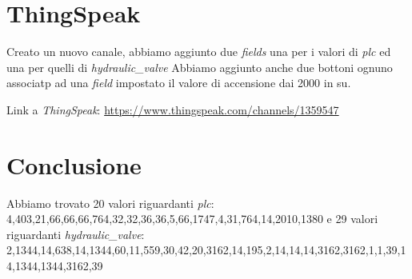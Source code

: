 \documentclass{article}
\begin{document}
\section{ThingSpeak}
Creato un nuovo canale, abbiamo aggiunto due \textit{fields} una per i valori di \textit{plc} ed una per quelli di \textit{hydraulic\_valve} \hfill \break
Abbiamo aggiunto anche due bottoni ognuno associatp ad una \textit{field} impostato il valore di accensione dai 2000 in su.

\hfill \break 
Link a \textit{ThingSpeak}:  \href{https://www.thingspeak.com/channels/1359547}{https://www.thingspeak.com/channels/1359547}

\section{Conclusione}
Abbiamo trovato 20 valori riguardanti \textit{plc}: 4,403,21,66,66,66,764,32,32,36,36,5,66,1747,4,31,764,14,2010,1380  \hfill \break 
e 29 valori riguardanti \textit{hydraulic\_valve}: 2,1344,14,638,14,1344,60,11,559,30,42,20,3162,14,195,2,14,14,14,3162,3162,1,1,39,14,1344,1344,3162,39
\end{document}
